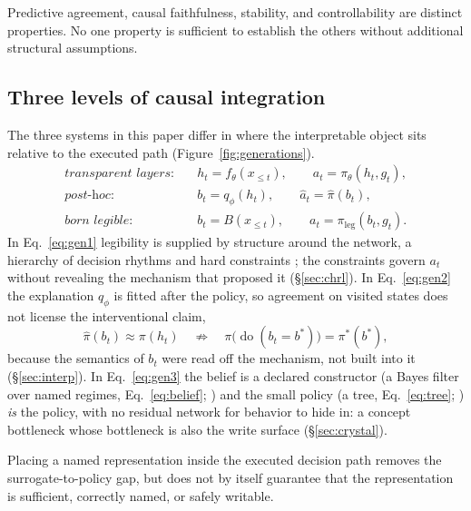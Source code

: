 \begin{proposition}
\label{prop:nonequiv}
Predictive agreement, causal faithfulness, stability, and controllability are distinct
properties. No one property is sufficient to establish the others without additional
structural assumptions.
\end{proposition}

\subsection{Three levels of causal integration}
\label{sec:theory:generations}

The three systems in this paper differ in where the interpretable object sits relative to
the executed path (Figure~\ref{fig:generations}).
\begin{align}
\textit{transparent layers:}\quad & h_t = f_\theta(x_{\le t}), \qquad a_t = \pi_\theta(h_t, g_t),
\label{eq:gen1}\\
\textit{post-hoc:}\quad & b_t = q_\phi(h_t), \qquad \hat a_t = \hat\pi(b_t),
\label{eq:gen2}\\
\textit{born legible:}\quad & b_t = B(x_{\le t}), \qquad a_t = \pi_{\text{leg}}(b_t, g_t).
\label{eq:gen3}
\end{align}
In Eq.~\ref{eq:gen1} legibility is supplied by structure around the network, a hierarchy of
decision rhythms \citep{sutton1999options,bacon2017option} and hard constraints
\citep{achiam2017}; the constraints govern $a_t$ without revealing the mechanism that proposed
it (\S\ref{sec:chrl}). In Eq.~\ref{eq:gen2} the explanation $q_\phi$ is fitted after the
policy, so agreement on visited states does not license the interventional claim,
\begin{equation}
\hat\pi(b_t) \approx \pi(h_t)
\quad\not\Rightarrow\quad
\pi\big(\operatorname{do}(b_t = b^{*})\big) = \pi^{*}(b^{*}),
\label{eq:noimply}
\end{equation}
because the semantics of $b_t$ were read off the mechanism, not built into it
\citep{olah2020,atrey2020} (\S\ref{sec:interp}). In Eq.~\ref{eq:gen3} the belief is a declared
constructor (a Bayes filter over named regimes, Eq.~\ref{eq:belief}; \citealp{kaelbling1998})
and the small policy (a tree, Eq.~\ref{eq:tree}; \citealp{frosst2017}) \emph{is} the policy,
with no residual network for behavior to hide in: a concept bottleneck \citep{koh2020} whose
bottleneck is also the write surface (\S\ref{sec:crystal}).

\begin{proposition}
\label{prop:integration}
Placing a named representation inside the executed decision path removes the
surrogate-to-policy gap, but does not by itself guarantee that the representation is
sufficient, correctly named, or safely writable.
\end{proposition}

